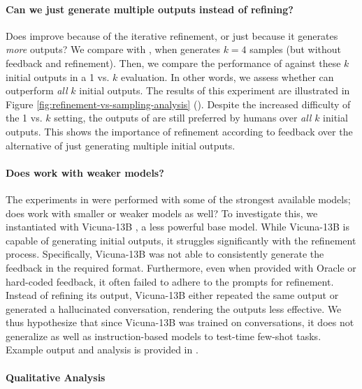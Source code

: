 \paragraph{Can we just generate multiple outputs instead of refining?}

Does \ours improve because of the iterative refinement, or just because it generates \emph{more} outputs? 
We compare \ours with \chatgpt, when \chatgpt generates $k=4$ samples (but without feedback and refinement). 
Then, we compare the performance of \ours against these $k$ initial outputs in a 1 vs. $k$ evaluation. In other words, we assess whether \ours can outperform \emph{all} $k$ initial outputs.
The results of this experiment are illustrated in Figure \ref{fig:refinement-vs-sampling-analysis} ().  Despite the increased difficulty of the 1 vs. $k$ setting,  the outputs of \ours are still preferred by humans over \emph{all} $k$ initial outputs.
This shows the importance of refinement according to feedback over the alternative of just generating multiple initial outputs.




\paragraph{Does \ours work with weaker models?}
The experiments in  were performed with some of the strongest available models; does \ours work with smaller or weaker models as well?
To investigate this, we instantiated \ours with Vicuna-13B \citep{chiang2023vicuna}, a less powerful base model. While Vicuna-13B is capable of generating initial outputs, it struggles significantly with the refinement process.
Specifically, Vicuna-13B was not able to consistently generate the feedback in the required format. Furthermore, even when provided with Oracle or hard-coded feedback, it often failed to adhere to the prompts for refinement. Instead of refining its output, Vicuna-13B either repeated the same output or generated a hallucinated conversation, rendering the outputs less effective. We thus hypothesize that since Vicuna-13B was trained on conversations, it does not generalize as well as instruction-based models to test-time few-shot tasks. 
Example output and analysis is provided in .



\paragraph{Qualitative Analysis}

